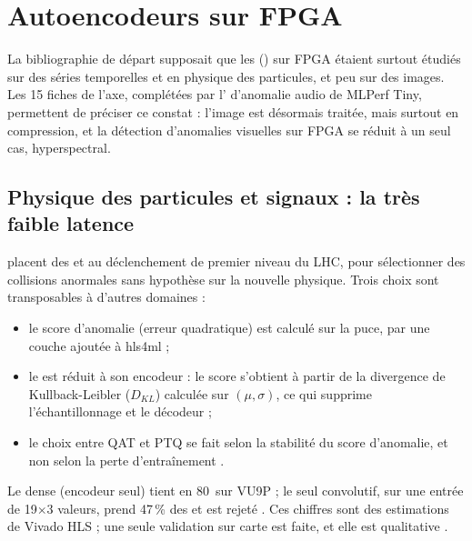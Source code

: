 \section{Autoencodeurs sur FPGA}
\label{sec:autoencodeurs}

La bibliographie de départ supposait que les  () sur FPGA étaient surtout
étudiés sur des séries temporelles et en physique des particules, et peu sur des images.
Les 15 fiches de l'axe, complétées par l' d'anomalie audio de MLPerf Tiny, permettent de
préciser ce constat : l'image est désormais traitée, mais surtout en compression, et la
détection d'anomalies visuelles sur FPGA se réduit à un seul cas, hyperspectral.

\subsection{Physique des particules et signaux : la très faible latence}

\citet{arxiv-2108.03986-autoencoders-fpgas-real-time-unsupervised} placent des  et 
au déclenchement de premier niveau du LHC, pour sélectionner des collisions anormales sans
hypothèse sur la nouvelle physique. Trois choix sont transposables à d'autres domaines :
\begin{itemize}
  \item le score d'anomalie (erreur quadratique) est calculé sur la puce, par une couche
    ajoutée à hls4ml  ;
  \item le  est réduit à son encodeur : le score s'obtient à partir de la divergence de
    Kullback-Leibler ($D_{KL}$) calculée sur $(\mu, \sigma)$, ce qui supprime
    l'échantillonnage et le décodeur  ;
  \item le choix entre QAT et PTQ se fait selon la stabilité du score d'anomalie, et non
    selon la perte d'entraînement .
\end{itemize}
Le  dense (encodeur seul) tient en 80\, sur VU9P ; le seul  convolutif, sur une
entrée de 19$\times$3 valeurs, prend 47\,\% des  et est rejeté . Ces
chiffres sont des estimations de Vivado HLS ; une seule validation sur carte est faite, et
elle est qualitative .

